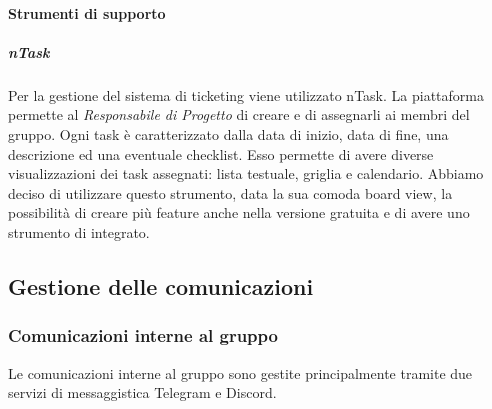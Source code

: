 \paragraph{Strumenti di supporto}
\subparagraph{nTask} \Spazio
Per la gestione del sistema di ticketing viene utilizzato nTask. La piattaforma permette al \emph{Responsabile di Progetto} di creare  e di assegnarli ai membri del gruppo. Ogni task è caratterizzato dalla
data di inizio, data di fine, una descrizione ed una eventuale checklist. Esso permette di avere diverse visualizzazioni dei task assegnati: lista testuale, griglia e calendario. Abbiamo deciso di utilizzare questo strumento, data la sua comoda board view, la possibilità di creare più feature anche nella versione gratuita e di avere uno strumento di  integrato.

\subsection{Gestione delle comunicazioni}
\subsubsection{Comunicazioni interne al gruppo}
Le comunicazioni interne al gruppo sono gestite principalmente tramite due servizi di messaggistica Telegram e Discord.
